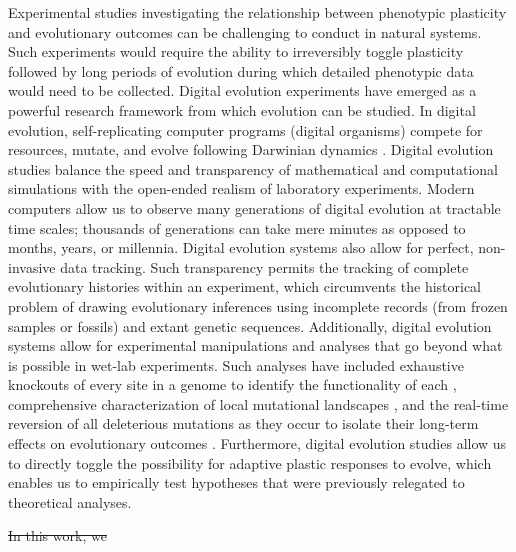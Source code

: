 \documentclass[utf8]{frontiersSCNS} %
\providecommand{\DIFdeltex}[1]{{\protect\color{red}\sout{#1}}}                      %
\providecommand{\DIFaddbegin}{} %
\providecommand{\DIFdelbegin}{} %
\providecommand{\DIFdelend}{} %
\providecommand{\DIFdel}[1]{\texorpdfstring{\DIFdeltex{#1}}{}} %
\newcommand{\DIFscaledelfig}{0.5}
\newlength{\DIFdelgraphicswidth} %
\newlength{\DIFdelgraphicsheight} %
\newcommand{\DIFaddincludegraphics}[2][]{{\color{blue}\fbox{\DIFOincludegraphics[#1]{#2}}}} %
\newcommand{\DIFdelincludegraphics}[2][]{%
\sbox{\DIFdelgraphicsbox}{\DIFOincludegraphics[#1]{#2}}%
\settoboxwidth{\DIFdelgraphicswidth}{\DIFdelgraphicsbox} %
\settoboxtotalheight{\DIFdelgraphicsheight}{\DIFdelgraphicsbox} %
\scalebox{\DIFscaledelfig}{%
\parbox[b]{\DIFdelgraphicswidth}{\usebox{\DIFdelgraphicsbox}\\[-\baselineskip] \rule{\DIFdelgraphicswidth}{0em}}\llap{\resizebox{\DIFdelgraphicswidth}{\DIFdelgraphicsheight}{%
\setlength{\unitlength}{\DIFdelgraphicswidth}%
\begin{picture}(1,1)%
\thicklines\linethickness{2pt} %
{\color[rgb]{1,0,0}\put(0,0){\framebox(1,1){}}}%
{\color[rgb]{1,0,0}\put(0,0){\line( 1,1){1}}}%
{\color[rgb]{1,0,0}\put(0,1){\line(1,-1){1}}}%
\end{picture}%
}\hspace*{3pt}}} %
} %
\DeclareRobustCommand{\DIFaddbegin}{\DIFOaddbegin \let\includegraphics\DIFaddincludegraphics} %
\DeclareRobustCommand{\DIFdelbegin}{\DIFOdelbegin \let\includegraphics\DIFdelincludegraphics} %
\DeclareRobustCommand{\DIFdelend}{\DIFOaddend \let\includegraphics\DIFOincludegraphics} %
\begin{document}
\begin{raggedbottom}
Experimental studies investigating the relationship between phenotypic plasticity and evolutionary outcomes can be challenging to conduct in natural systems.
Such experiments would require the ability to irreversibly toggle plasticity followed by long periods of evolution during which detailed phenotypic data would need to be collected.
Digital evolution experiments have emerged as a powerful research framework from which evolution can be studied.
In digital evolution, self-replicating computer programs (digital organisms) compete for resources, mutate, and evolve following Darwinian dynamics  \citep{wilke_biology_2002}.
Digital evolution studies balance the speed and transparency of mathematical and computational simulations with the open-ended realism of laboratory experiments.
Modern computers allow us to observe many generations of digital evolution at tractable time scales; thousands of generations can take mere minutes as opposed to months, years, or millennia.
Digital evolution systems also allow for perfect, non-invasive data tracking.
Such transparency permits the tracking of complete evolutionary histories within an experiment, which circumvents the historical problem of drawing evolutionary inferences using incomplete records (from frozen samples or fossils) and extant genetic sequences.
Additionally, digital evolution systems allow for experimental manipulations and analyses that go beyond what is possible in wet-lab experiments.
Such analyses have included exhaustive knockouts of every site in a genome to identify the functionality of each \citep{lenski_evolutionary_2003},
comprehensive characterization of local mutational landscapes \citep{lenski_genome_1999,canino-koning_fluctuating_2019},
and the real-time reversion of all deleterious mutations as they occur to isolate their long-term effects on evolutionary outcomes \citep{covert_experiments_2013}.
Furthermore, digital evolution studies allow us to directly toggle the possibility for adaptive plastic responses to evolve, which enables us to empirically test hypotheses that were previously relegated to theoretical analyses.

\DIFdelbegin \DIFdel{In this work, we }\DIFdelend \DIFaddbegin 


\end{raggedbottom}
\end{document}
